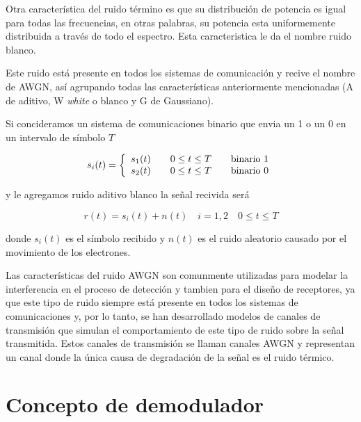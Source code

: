 Otra caracter\'istica del ruido t\'ermino es que su distribuci\'on de potencia es igual para
todas las frecuencias, en otras palabras, su potencia esta uniformemente distribuida a trav\'es de
todo el espectro. Esta caracteristica le da el nombre ruido blanco.

Este ruido est\'a presente en todos los sistemas de comunicaci\'on y recive el nombre de AWGN, as\'i
agrupando todas las caracter\'isticas anteriormente mencionadas (A de aditivo, W \emph{white} o
blanco y G de Gaussiano).

Si concideramos un sistema de comunicaciones binario que envia un 1 o un 0 en un intervalo de
s\'imbolo $T$

\begin{equation}\label{eq:binarycom}
s_i(t)=\left\{
\begin{array}{l l l}
s_1(t) & \quad 0\leq t \leq T & \quad \mbox{binario 1}\\
s_2(t) & \quad 0\leq t \leq T & \quad \mbox{binario 0}\\
\end{array}\right.
\end{equation}

y le agregamos ruido aditivo blanco la se\~nal recivida ser\'a

\begin{equation}\label{eq:signoise}
r(t)=s_i(t)+n(t) \quad i=1,2 \quad 0\leq t \leq T
\end{equation}

donde $s_i(t)$ es el s\'imbolo recibido y $n(t)$ es el ruido aleatorio causado por el movimiento de
los electrones.

Las caracter\'isticas del ruido AWGN son comunmente utilizadas para modelar la interferencia en
el proceso de detecci\'on y tambien para el dise\~no de receptores, ya que este tipo de ruido
siempre est\'a presente en todos los sistemas de comunicaciones y, por lo tanto, se han desarrollado
modelos de canales de transmisi\'on que simulan el comportamiento de este tipo de ruido sobre la
se\~nal transmitida. Estos canales de transmisi\'on se llaman canales AWGN y representan un canal
donde la \'unica causa de degradaci\'on de la se\~nal es el ruido t\'ermico.

\section{Concepto de demodulador}

